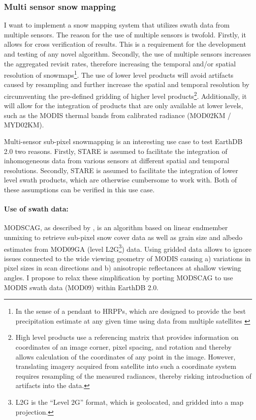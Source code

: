 \documentclass[letterpaper, parskip=half]{scrartcl}
\begin{document}
\subsubsection{Multi sensor snow mapping}
I want to implement a snow mapping system that utilizes swath data from multiple sensors. The reason for the use of multiple sensors is twofold. Firstly, it allows for cross verification of results. This is a requirement for the development and testing of any novel algorithm. Secondly, the use of multiple sensors increases the aggregated revisit rates, therefore increasing the temporal and/or spatial resolution of snowmaps\footnote{In the sense of a pendant to \glspl{HRPP}, which are designed to provide the best precipitation estimate at any given time using data from multiple satellites \citep{Lettenmaier2015}}.
The use of lower level products will avoid artifacts caused by resampling and further increase the spatial and temporal resolution by circumventing the pre-defined gridding of higher level products\footnote{High level products use a referencing matrix that provides information on coordinates of an image corner, pixel spacing, and rotation and thereby allows calculation of the coordinates of any point in the image. However, translating imagery acquired from satellite into such a coordinate system requires resampling of the measured radiances, thereby risking introduction of artifacts into the data.}. Additionally, it will allow for the integration of products that are only available at lower levels, such as the MODIS thermal bands from calibrated radiance (MOD02KM / MYD02KM).

Multi-sensor sub-pixel snowmapping is an interesting use case to test EarthDB 2.0 two reasons.
Firstly, \gls{STARE} is assumed to facilitate the integration of inhomogeneous data from various sensors at different spatial and temporal resolutions. 
Secondly, \gls{STARE} is assumed to facilitate the integration of lower level swath products, which are otherwise cumbersome to work with. Both of these assumptions can be verified in this use case.

\paragraph{Use of swath data:}
\gls{MODSCAG}, as described by \citep{Painter2009}, is an algorithm based on linear endmember unmixing to retrieve sub-pixel snow cover data as well as grain size and albedo estimates from MOD09GA (level \gls{L2G}\footnote{L2G is the ``Level 2G'' format, which is geolocated, and gridded into a map projection.}) data. 
Using gridded data allows to ignore issues connected to the wide viewing geometry of MODIS causing a) variations in pixel sizes in scan directions and b) anisotropic reflectances at shallow viewing angles. I  propose to relax these simplification by porting MODSCAG to use MODIS swath data (MOD09) within EarthDB 2.0.
\end{document}
